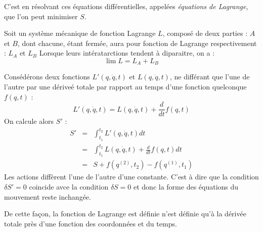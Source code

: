 C'est en résolvant ces équations différentielles, appelées \textit{équations de Lagrange}, que l'on peut minimiser \(S\). 
\begin{corollary}
    Soit un système mécanique de fonction Lagrange \(L\), composé de deux parties : \(A\) et \(B\), dont chacune, étant fermée, aura pour fonction de Lagrange respectivement : \(L_{A} \text{ et } L_{B}\) Lorsque leurs intératarctions tendent à diparaitre, on a : 
    \begin{equation}
        \label{2.7}
        \lim L = L_{A} + L_{B}
    \end{equation}
\end{corollary}

\begin{remark}
    Consédérons deux fonctions \(L'(q,\dot{q},t)\) et \(L(q,\dot{q},t)\), ne différant que l'une de l'autre par une dériveé totale par rapport au temps d'une fonction quelconque \(f(q,t)\) : 
    \begin{equation}
        \label{2.8}
        L'(q,\dot{q},t) = L(q,\dot{q},t) + \frac{d}{dt}f(q,t)
    \end{equation}  
    On calcule alors \(S'\) : 
    \begin{eqnarray*}
        S' &=& \int_{t_{1}}^{t_{2}} L'(q,\dot{q},t)  dt \\
        &=& \int_{t_{1}}^{t_{2}} L(q,\dot{q},t) + \frac{d}{dt}f(q,t)  dt \\
        &=& S + f(q^{(2)},t_{2}) - f(q^{(1)},t_{1})
    \end{eqnarray*}
    Les actions diffèrent l'une de l'autre d'une constante. C'est à dire que la condition \(\delta S' = 0\) coincide avce la condition \(\delta S = 0\) et donc la forme des équations du mouvement reste inchangée.\par
    De cette façon, la fonction de Lagrange est définie n'est définie qu'à la dérivée totale près d'une fonction des coordonnées et du temps.  
\end{remark}